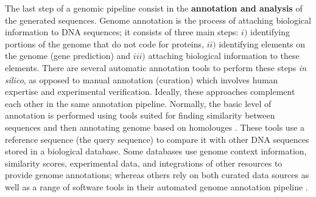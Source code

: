 The last step of a genomic pipeline consist in the \textbf{annotation and analysis} of the generated sequences. Genome annotation is the process of attaching biological information to DNA sequences; it consists of three main steps: $i)$ identifying portions of the genome that do not code for proteins, $ii)$ identifying elements on the genome (gene prediction) and $iii)$ attaching biological information to these elements. There are several automatic annotation tools to perform these steps \textit{in silico}, as opposed to manual annotation (curation) which involves human expertise and experimental verification. Ideally, these approaches complement each other in the same annotation pipeline. Normally, the basic level of annotation is performed using tools suited for finding similarity between sequences and then annotating genome based on homolouges \cite{altschul1990basic, langmead2012fast}. These tools use a reference sequence (the query sequence) to compare it with other DNA sequences stored in a biological database. Some databases use genome context information, similarity scores, experimental data, and integrations of other resources to provide genome annotations; whereas others rely on both curated data sources as well as a range of software tools in their automated genome annotation pipeline \cite{flicek2012ensembl}.\\
